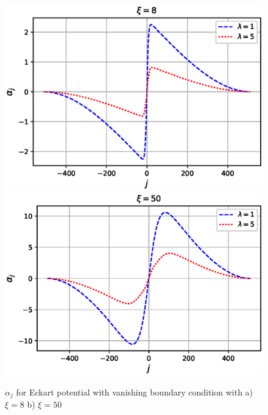 \documentclass[11pt,a4paper]{article}
\begin{document}
\begin{figure}[!ht]
\begin{center}
\includegraphics[scale=0.5]{pics/alpha_j_eckart_potn_loc.eps}
\includegraphics[scale=0.5]{pics/alpha_j_eckart_potn_nonloc.eps}
\caption{ $\alpha_j$ for Eckart potential  with vanishing boundary condition  with a) $\xi=8$ b) $\xi=50$}
\end{center}
\end{figure}
\end{document}
